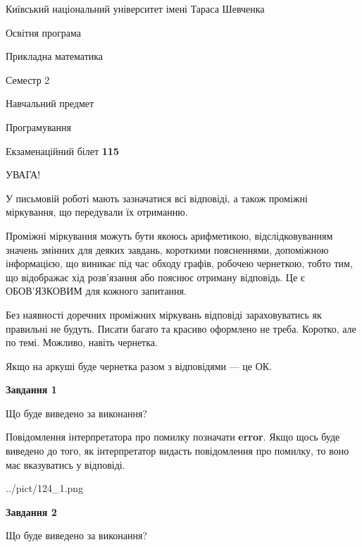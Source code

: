 \documentclass[12pt, ukrainian]{article}
\begin{document}
{{\begin {small}\par
{ \center  Київський національний університет імені Тараса Шевченка \par}
{\parbox {5 cm}{Освітня програма \hfill}{\parbox {7 cm}{Прикладна математика \hfill}}\parbox {6 cm}{\hfill Семестр 2}}\par
{\parbox {5 cm} {Навчальний предмет \hfill}\parbox {7 cm}{Програмування \hfill}\parbox {6cm}{\hfill}\par}\vspace{-7pt} \end{small}}{\center Екзаменаційний білет \No \textbf
{ 115 }\par}}
{
\begin {large}
УВАГА!

У письмовій роботі мають зазначатися всі відповіді, а також проміжні міркування, що передували їх отриманню.

Проміжні міркування можуть бути якоюсь арифметикою, відслідковуванням зна\-чень змінних для деяких завдань,
короткими поясненнями, допоміжною інформацією, що виникає під час обходу графів, робочею чернеткою,
тобто тим, що відображає хід розв’язання або пояснює отриману відповідь.
Це є ОБОВ’ЯЗКОВИМ для кожного запитання.

Без наявності доречних проміжних міркувань відповіді зараховуватись як правиль\-ні не будуть.
Писати багато та красиво оформлено не треба. Коротко, але по темі. Можли\-во, навіть чернетка.

Якщо на аркуші буде чернетка разом з відповідями --- це ОК.

\newpage

{\begin {center}\textbf{Завдання 1}\end {center}}\par
Що буде виведено за виконання?

Повідомлення інтерпретатора про помилку позначати \textbf{error}.
Якщо щось буде виведено до того, як інтерпретатор видасть повідомлення про помилку, 
то воно має вказуватись у відповіді. \par


\begin{center}
	{../pict/124_1.png}
\end{center}
\newpage

{\begin {center}\textbf{Завдання 2}\end {center}}\par
Що буде виведено за виконання?


\end{large}}
\end{document}
